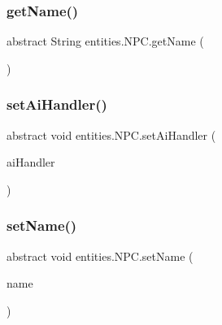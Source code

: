 \subsubsection{\texorpdfstring{get\+Name()}{getName()}}
{\footnotesize\ttfamily abstract String entities.\+N\+P\+C.\+get\+Name (\begin{DoxyParamCaption}{ }\end{DoxyParamCaption})\hspace{0.3cm}{\ttfamily [abstract]}}

\mbox{\label{classentities_1_1_n_p_c_a249e570db56402a0e7784f4419f85ca6}} 
\subsubsection{\texorpdfstring{set\+Ai\+Handler()}{setAiHandler()}}
{\footnotesize\ttfamily abstract void entities.\+N\+P\+C.\+set\+Ai\+Handler (\begin{DoxyParamCaption}\item[{\mbox{\hyperlink{classentities_1_1_a_i_handler_basic}{A\+I\+Handler\+Basic}}}]{ai\+Handler }\end{DoxyParamCaption})\hspace{0.3cm}{\ttfamily [abstract]}}

\mbox{\label{classentities_1_1_n_p_c_aab66c1bf49e6eba132dcf1d21885ee48}} 
\subsubsection{\texorpdfstring{set\+Name()}{setName()}}
{\footnotesize\ttfamily abstract void entities.\+N\+P\+C.\+set\+Name (\begin{DoxyParamCaption}\item[{String}]{name }\end{DoxyParamCaption})\hspace{0.3cm}{\ttfamily [abstract]}}

